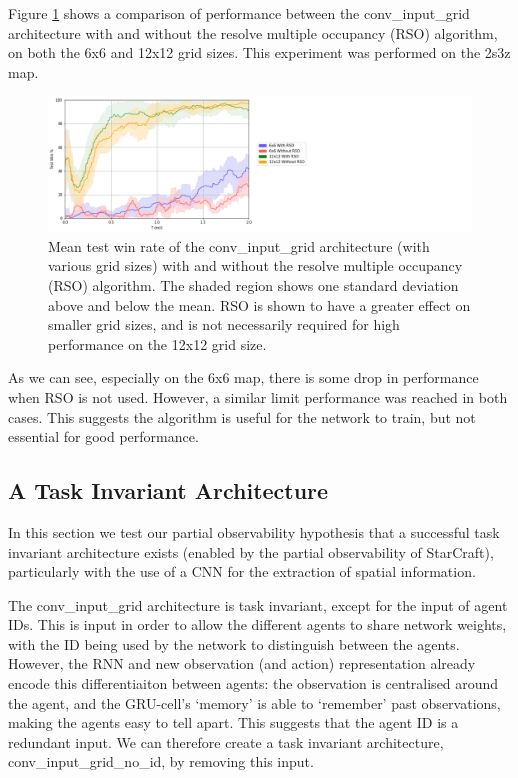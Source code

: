 Figure \ref{fig:multocc} shows a comparison of performance between the conv\_input\_grid architecture with and without the resolve multiple occupancy (RSO) algorithm, on both the 6x6 and 12x12 grid sizes. This experiment was performed on the 2s3z map.

\begin{figure}
    \centering
    \hbox{\hspace{5em}\includegraphics[scale=0.5]{images/graphs/mult_occ.png}}
    \caption{Mean test win rate of the conv\_input\_grid architecture (with various grid sizes) with and without the resolve multiple occupancy (RSO) algorithm. The shaded region shows one standard deviation above and below the mean. RSO is shown to have a greater effect on smaller grid sizes, and is not necessarily required for high performance on the 12x12 grid size.}
    \label{fig:multocc}
\end{figure}

As we can see, especially on the 6x6 map, there is some drop in performance when RSO is not used. However, a similar limit performance was reached in both cases. This suggests the algorithm is useful for the network to train, but not essential for good performance. 


\subsection{A Task Invariant Architecture}
In this section we test our partial observability hypothesis that a successful task invariant architecture exists (enabled by the partial observability of StarCraft), particularly with the use of a CNN for the extraction of spatial information.

The conv\_input\_grid architecture is task invariant, except for the input of agent IDs. This is input in order to allow the different agents to share network weights, with the ID being used by the network to distinguish between the agents. However, the RNN and new observation (and action) representation already encode this differentiaiton between agents: the observation is centralised around the agent, and the GRU-cell's `memory' is able to `remember' past observations, making the agents easy to tell apart. This suggests that the agent ID is a redundant input. We can therefore create a task invariant architecture, conv\_input\_grid\_no\_id, by removing this input.


